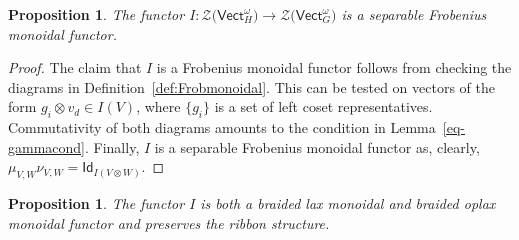 \documentclass[pdftex]{sigma}
\numberwithin{equation}{section}
\newtheorem{Proposition}[Theorem]{Proposition}
 { \theoremstyle{definition}
\newtheorem{Definition}[Theorem]{Definition}
\newtheorem{Note}[Theorem]{Note}
\newtheorem{Notation}[Theorem]{Notation}
\newtheorem{Example}[Theorem]{Example}
\newtheorem{Remark}[Theorem]{Remark} }
\newcommand{\ide}{\mathsf{Id}}
\newcommand{\Vect}{\mathsf{Vect}}
\newcommand{\cZ}{\mathcal{Z}}
\newcommand{\rI}{I}
\begin{document}
\begin{Proposition}\label{prop:Frob}
The functor $\rI\colon \cZ\big(\Vect_H^\omega\big)\to \cZ\big(\Vect_G^\omega\big)$ is a separable Frobenius monoidal functor.
\end{Proposition}
\begin{proof}
The claim that $\rI$ is a Frobenius monoidal functor follows from checking the diagrams in Definition~\ref{def:Frobmonoidal}. This can be tested on vectors of the form $g_i\otimes v_d\in \rI(V)$, where $\{g_i\}$ is a set of left coset representatives. Commutativity of both diagrams amounts to the condition in Lemma~\ref{eq-gammacond}. Finally, $\rI$ is a separable Frobenius monoidal functor as, clearly, $\mu_{V,W}\nu_{V,W}=\ide_{\rI(V\otimes W)}$.
\end{proof}

\begin{Proposition}\label{prop:braidedFrob}
The functor $I$ is both a braided lax monoidal and braided oplax monoidal functor and preserves the ribbon structure.
\end{Proposition}
\end{document}
